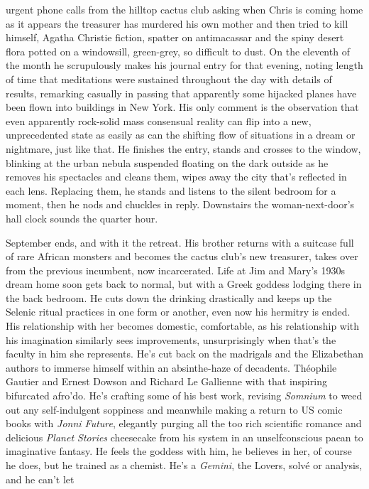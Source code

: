\documentclass[
]{article}
\begin{document}
urgent phone calls from the hilltop cactus club asking when Chris is
coming home as it appears the treasurer has murdered his own mother and
then tried to kill himself, Agatha Christie fiction, spatter on
antimacassar and the spiny desert flora potted on a windowsill,
green-grey, so difficult to dust. On the eleventh of the month he
scrupulously makes his journal entry for that evening, noting length of
time that meditations were sustained throughout the day with details of
results, remarking casually in passing that apparently some hijacked
planes have been flown into buildings in New York. His only comment is
the observation that even apparently rock-solid mass consensual reality
can flip into a new, unprecedented state as easily as can the shifting
flow of situations in a dream or nightmare, just like that. He finishes
the entry, stands and crosses to the window, blinking at the urban
nebula suspended floating on the dark outside as he removes his
spectacles and cleans them, wipes away the city that's reflected in each
lens. Replacing them, he stands and listens to the silent bedroom for a
moment, then he nods and chuckles in reply. Downstairs the
woman-next-door's hall clock sounds the quarter hour. \par
September ends, and with it the retreat. His brother returns with
a suitcase full of rare African monsters and becomes the cactus club's
new treasurer, takes over from the previous incumbent, now incarcerated.
Life at Jim and Mary's 1930s dream home soon gets back to normal, but
with a Greek goddess lodging there in the back bedroom. He cuts down the
drinking drastically and keeps up the Selenic ritual practices in one
form or another, even now his hermitry is ended. His relationship with
her becomes domestic, comfortable, as his relationship with his
imagination similarly sees improvements, unsurprisingly when that's the
faculty in him she represents. He's cut back on the madrigals and the
Elizabethan authors to immerse himself within an absinthe-haze of
decadents. Théophile Gautier and Ernest Dowson and Richard Le Gallienne
with that inspiring bifurcated afro'do. He's crafting some of his best
work, revising \emph{Somnium} to weed out any self-indulgent soppiness
and meanwhile making a return to US comic books with \emph{Jonni
Future}, elegantly purging all the too rich scientific romance and
delicious \emph{Planet Stories} cheesecake from his system in an
unselfconscious paean to imaginative fantasy. He feels the goddess with
him, he believes in her, of course he does, but he trained as a chemist.
He's a \emph{Gemini}, the Lovers, solvé or analysis, and he can't let
\end{document}
